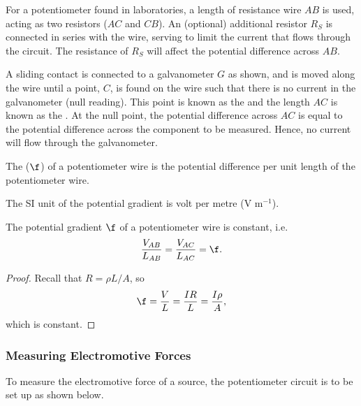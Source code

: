 For a potentiometer found in laboratories, a length of resistance wire $AB$ is used, acting as two resistors ($AC$ and $CB$). An (optional) additional resistor $R_S$ is connected in series with the wire, serving to limit the current that flows through the circuit. The resistance of $R_S$ will affect the potential difference across $AB$.

A sliding contact is connected to a galvanometer $G$ as shown, and is moved along the wire until a point, $C$, is found on the wire such that there is no current in the galvanometer (null reading). This point is known as the  and the length $AC$ is known as the . At the null point, the potential difference across $AC$ is equal to the potential difference across the component to be measured. Hence, no current will flow through the galvanometer.

\begin{definition}
    The  ($\f$) of a potentiometer wire is the potential difference per unit length of the potentiometer wire.
\end{definition}

The SI unit of the potential gradient is volt per metre (V m$^{-1}$).

\begin{principle}
    The potential gradient $\f$ of a potentiometer wire is constant, i.e. \[\frac{V_{AB}}{L_{AB}} = \frac{V_{AC}}{L_{AC}} = \f.\]
\end{principle}
\begin{proof}
    Recall that $R = \rho L / A$, so \[\f = \frac{V}{L} = \frac{IR}{L} = \frac{I \rho}{A},\] which is constant.
\end{proof}

\subsubsection{Measuring Electromotive Forces}

To measure the electromotive force of a source, the potentiometer circuit is to be set up as shown below.

